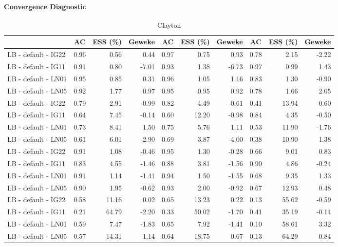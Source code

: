 \documentclass{amsart}
\begin{document}
\paragraph{Convergence Diagnostic}
\begin{table}[ht]
	\centering
	\caption{Clayton}
	\scriptsize{
		\begin{tabular}{l|crr|crr|crr}
			\toprule
			& AC & ESS (\%) & Geweke & AC & ESS (\%) & Geweke & AC & ESS (\%) & Geweke \\ 
			\midrule
			LB - default - IG22 & 0.96 & 0.56 & 0.44 & 0.97 & 0.75 & 0.93 & 0.78 & 2.15 & -2.22 \\ 
			LB - default - IG11 & 0.91 & 0.80 & -7.01 & 0.93 & 1.38 & -6.73 & 0.97 & 0.99 & 1.43 \\ 
			LB - default - LN01 & 0.95 & 0.85 & 0.31 & 0.96 & 1.05 & 1.16 & 0.83 & 1.30 & -0.90 \\ 
			LB - default - LN05 & 0.92 & 1.77 & 0.97 & 0.95 & 0.95 & 0.92 & 0.78 & 1.66 & 2.05 \\ 
			\midrule
			LB - default - IG22 & 0.79 & 2.91 & -0.99 & 0.82 & 4.49 & -0.61 & 0.41 & 13.94 & -0.60 \\ 
			LB - default - IG11 & 0.64 & 7.45 & -0.14 & 0.60 & 12.20 & -0.98 & 0.84 & 4.35 & -0.50 \\ 
			LB - default - LN01 & 0.73 & 8.41 & 1.50 & 0.75 & 5.76 & 1.11 & 0.53 & 11.90 & -1.76 \\ 
			LB - default - LN05 & 0.61 & 6.01 & -2.90 & 0.69 & 3.87 & -4.00 & 0.38 & 10.90 & 1.38 \\ 
			 \midrule
			LB - default - IG22 & 0.91 & 1.08 & -0.46 & 0.95 & 1.30 & -0.28 & 0.66 & 9.01 & 0.83 \\ 
			LB - default - IG11 & 0.83 & 4.55 & -1.46 & 0.88 & 3.81 & -1.56 & 0.90 & 4.86 & -0.24 \\ 
			LB - default - LN01 & 0.91 & 1.14 & -1.41 & 0.94 & 1.50 & -1.55 & 0.68 & 9.35 & 1.33 \\ 
			LB - default - LN05 & 0.90 & 1.95 & -0.62 & 0.93 & 2.00 & -0.92 & 0.67 & 12.93 & 0.48 \\ 
			\midrule
			LB - default - IG22 & 0.58 & 11.16 & 0.02 & 0.65 & 13.23 & 0.22 & 0.13 & 55.62 & -0.59 \\ 
			LB - default - IG11 & 0.21 & 64.79 & -2.20 & 0.33 & 50.02 & -1.70 & 0.41 & 35.19 & -0.14 \\ 
			LB - default - LN01 & 0.59 & 7.47 & -1.83 & 0.65 & 7.92 & -1.41 & 0.10 & 58.61 & 3.32 \\ 
			LB - default - LN05 & 0.57 & 14.31 & 1.14 & 0.64 & 18.75 & 0.67 & 0.13 & 64.29 & -0.84 \\ 

\end{tabular}}
\end{table}
\end{document}
